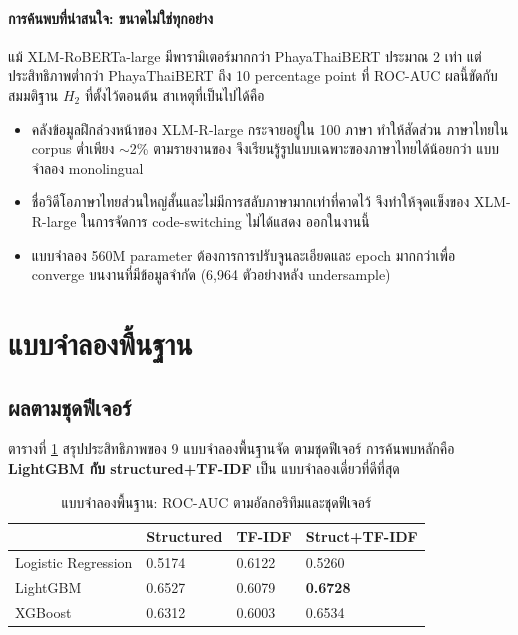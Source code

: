 \paragraph{การค้นพบที่น่าสนใจ: ขนาดไม่ใช่ทุกอย่าง}
แม้ XLM-RoBERTa-large มีพารามิเตอร์มากกว่า PhayaThaiBERT ประมาณ 2 เท่า แต่
ประสิทธิภาพต่ำกว่า PhayaThaiBERT ถึง 10 percentage point ที่ ROC-AUC
ผลนี้ขัดกับสมมติฐาน $H_2$ ที่ตั้งไว้ตอนต้น สาเหตุที่เป็นไปได้คือ

\begin{itemize}[leftmargin=2em]
  \item คลังข้อมูลฝึกล่วงหน้าของ XLM-R-large กระจายอยู่ใน 100 ภาษา ทำให้สัดส่วน
        ภาษาไทยใน corpus ต่ำเพียง $\sim$2\% ตามรายงานของ \textcite{conneau2020xlmr} จึงเรียนรู้รูปแบบเฉพาะของภาษาไทยได้น้อยกว่า
        แบบจำลอง monolingual
  \item ชื่อวิดีโอภาษาไทยส่วนใหญ่สั้นและไม่มีการสลับภาษามากเท่าที่คาดไว้
        จึงทำให้จุดแข็งของ XLM-R-large ในการจัดการ code-switching ไม่ได้แสดง
        ออกในงานนี้
  \item แบบจำลอง 560M parameter ต้องการการปรับจูนละเอียดและ epoch มากกว่าเพื่อ
        converge บนงานที่มีข้อมูลจำกัด (6{,}964 ตัวอย่างหลัง undersample)
\end{itemize}

\section{แบบจำลองพื้นฐาน}
\label{sec:results-baselines}

\subsection{ผลตามชุดฟีเจอร์}

ตารางที่ \ref{tab:baselines-feature} สรุปประสิทธิภาพของ 9 แบบจำลองพื้นฐานจัด
ตามชุดฟีเจอร์ การค้นพบหลักคือ \textbf{LightGBM กับ structured+TF-IDF} เป็น
แบบจำลองเดี่ยวที่ดีที่สุด

\begin{table}[H]
\centering
\caption{แบบจำลองพื้นฐาน: ROC-AUC ตามอัลกอริทึมและชุดฟีเจอร์}
\label{tab:baselines-feature}
\begin{tabularx}{\textwidth}{l|XXX}
\toprule
& \textbf{Structured} & \textbf{TF-IDF} & \textbf{Struct+TF-IDF} \\
\midrule
Logistic Regression & 0.5174 & 0.6122 & 0.5260 \\
LightGBM            & 0.6527 & 0.6079 & \textbf{0.6728} \\
XGBoost             & 0.6312 & 0.6003 & 0.6534 \\
\bottomrule
\end{tabularx}
\end{table}

